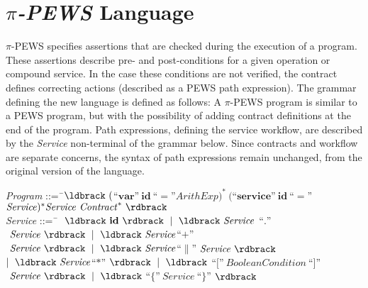 \appendix
\chapter{\textit{$\pi$-PEWS} Language}
\label{append:pews_language}


$\pi$-PEWS specifies assertions that are checked during the execution of
a program. These assertions describe pre- and post-conditions for a given
operation or compound service. In the case these conditions are not verified,
the contract defines correcting actions (described as a PEWS path expression).
%
%
The grammar defining the new language is defined as follows:
A $\pi$-PEWS program is similar to a PEWS program, but with the possibility of adding contract definitions at the end of the program.
Path expressions, defining the service workflow, are described by the \textit{Service} non-terminal of the grammar below. 
Since contracts and workflow are separate concerns, the syntax of path expressions remain unchanged, from the original version of the language.
\begin{small}
\begin{tabbing}
\reg \textit{Program} ::=\=  \ $\ldbrack\ ($``$\mathbf{var}$''$\ \mathbf{id}\ $``$=$''$ \mathit{ArithExp} )^*  \ ($``$\mathbf{service}$''$\ \mathbf{id}\ $``$=$''$ \mathit{Service})^* %
                                               \mathit{Service}\ \mathit{Contract}^ *\ \rdbrack$\\[1.5mm] 
\reg \textit{Service} ::=\=  \ $\ 	\ \ldbrack\  \mathbf{id} \ \rdbrack\ 
                                              \mid\ \ldbrack\ \mathit{Service}\ $``$.$''$\ \mathit{Service} \ \rdbrack\ 
                                              \mid\ \ldbrack\ \mathit{Service} $``$+$''$\ \mathit{Service} \ \rdbrack\ 
                                              \mid\ \ldbrack\  \mathit{Service} $``$\|$''$\ \mathit{Service} \ \rdbrack\ $\\ \>$
                                              \mid\ \ldbrack\  \mathit{Service}$``$*$''$\ \rdbrack\ 
                                              \mid\ \ldbrack\ $``$[$''$\ \mathit{BooleanCondition}\ $``$]$''$ \ \mathit{Service}\ \rdbrack\ 
                                              \mid\ \ldbrack\ $``$\{$''$\ 
                                              \mathit{Service}\ $``$\}$''$ \
                                              \rdbrack\ $\\[-3mm]
\end{tabbing}
\end{small}


